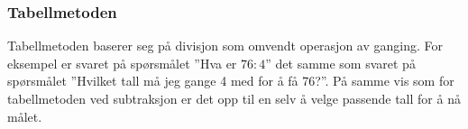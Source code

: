 \subsubsection{Tabellmetoden}
Tabellmetoden baserer seg på divisjon som omvendt operasjon av ganging. For eksempel er svaret på spørsmålet ''Hva er $ {76:4} $'' det samme som svaret på spørsmålet ''Hvilket tall må jeg gange 4 med for å få 76?''. På samme vis som for tabellmetoden ved subtraksjon er det opp til en selv å velge passende tall for å nå målet.
\begin{center}
	\parbox{0.35\linewidth}{
		} \qquad
\parbox{0.35\linewidth}{
	}  \newpage
\parbox{0.415\linewidth}{
	}
\end{center}


